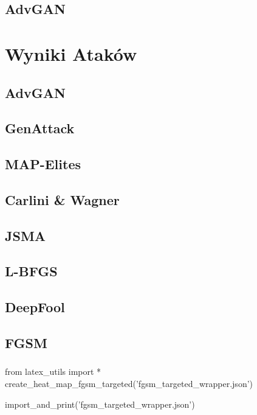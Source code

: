 \documentclass{article}
\begin{document}
\subsection{AdvGAN}


\section{Wyniki Ataków}\label{comparison}
\subsection{AdvGAN}
\subsection{GenAttack}
\subsection{MAP-Elites}
\subsection{Carlini \& Wagner}
\subsection{JSMA}
\subsection{L-BFGS}
\subsection{DeepFool}


\subsection{FGSM}
    \subsubsection{}

\begin{adjustbox}{max width=\textwidth}
\begin{pycode}
from latex_utils import *
create_heat_map_fgsm_targeted('fgsm_targeted_wrapper.json')
\end{pycode}
\end{adjustbox}

\begin{adjustbox}{max width=\textwidth}
\begin{pycode}
import_and_print('fgsm_targeted_wrapper.json')
\end{pycode}
\end{adjustbox}
\end{document}
